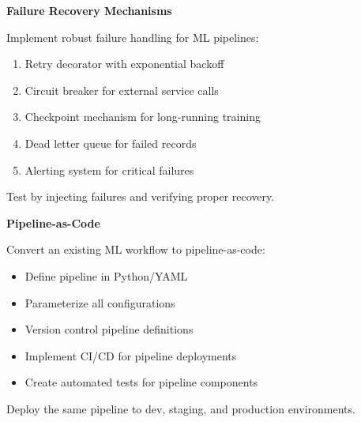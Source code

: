 \begin{exercise}
\textbf{Failure Recovery Mechanisms}

Implement robust failure handling for ML pipelines:
\begin{enumerate}
    \item Retry decorator with exponential backoff
    \item Circuit breaker for external service calls
    \item Checkpoint mechanism for long-running training
    \item Dead letter queue for failed records
    \item Alerting system for critical failures
\end{enumerate}

Test by injecting failures and verifying proper recovery.
\end{exercise}

\begin{exercise}
\textbf{Pipeline-as-Code}

Convert an existing ML workflow to pipeline-as-code:
\begin{itemize}
    \item Define pipeline in Python/YAML
    \item Parameterize all configurations
    \item Version control pipeline definitions
    \item Implement CI/CD for pipeline deployments
    \item Create automated tests for pipeline components
\end{itemize}

Deploy the same pipeline to dev, staging, and production environments.
\end{exercise}
